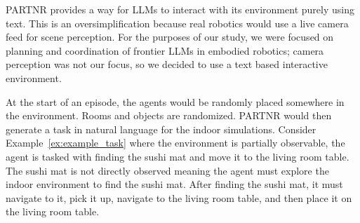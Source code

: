 PARTNR provides a way for LLMs to interact with its environment purely using text.  This is an oversimplification because real robotics would use a live camera feed for scene perception.  For the purposes of our study, we were focused on planning and coordination of frontier LLMs in embodied robotics; camera perception was not our focus, so we decided to use a text based interactive environment.

At the start of an episode, the agents would be randomly placed somewhere in the environment.  Rooms and objects are randomized.  PARTNR would then generate a task in natural language for the indoor simulations.  Consider Example~\ref{ex:example_task} where the environment is partially observable, the agent is tasked with finding the sushi mat and move it to the living room table.  The sushi mat is not directly observed meaning the agent must explore the indoor environment to find the sushi mat.  After finding the sushi mat, it must navigate to it, pick it up, navigate to the living room table, and then place it on the living room table.

